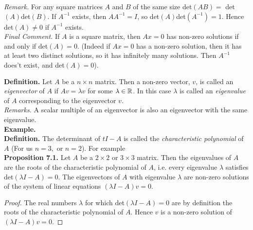\noindent \textit{Remark.} For any square matrices $A$ and $B$ of the same size det$(AB) =$ det$(A)$det$(B)$. If $A^{-1}$ exists, then $AA^{-1} = I$, so det$(A)$det$(A^{-1}) = 1$. Hence det$(A) \neq 0$ if $A^{-1}$ exists.\\

\noindent \textit{Final Comment.} If $A$ is a square matrix, then $Ax = 0$ has non-zero solutions if and only if det$(A) = 0$. (Indeed if $Ax = 0$ has a non-zero solution, then it has at least two distinct solutions, so it has infinitely many solutions. Then $A^{-1}$ does't exist, and det$(A) = 0$). 

\pagebreak


\noindent \textbf{Definition.} Let $A$ be a $n \times n$ matrix. Then a non-zero vector, $v$, is called an \emph{eigenvector} of $A$ if $Av = \lambda v$ for some $\lambda \in \mathbb{R}$. In this case $\lambda$ is called an \emph{eigenvalue} of $A$ corresponding to the eigenvector $v$.\\

\noindent \textit{Remarks.} A scalar multiple of an eigenvector is also an eigenvector with the same eigenvalue.\\

\noindent \textbf{Example.} \\

\noindent \textbf{Definition.} The determinant of $tI - A$ is called the \emph{characteristic polynomial} of $A$ (For us $n = 3,$ or $n=2$). For example\\

\noindent \textbf{Proposition 7.1.} Let $A$ be a $2 \times 2$ or $3 \times 3$ matrix. Then the eigenvalues of $A$ are the roots of the characteristic polynomial of $A$, i.e. every eigenvalue $\lambda$ satisfies det$(\lambda I - A) = 0$. The eigenvectors of $A$ with eigenvalue $\lambda$ are non-zero solutions of the system of linear equations $(\lambda I - A)v = 0$.

\begin{proof}
The real numbers $\lambda$ for which det$(\lambda I - A) = 0$ are by definition the roots of the characteristic polynomial of $A$. Hence $v$ is a non-zero solution of $(\lambda I - A)v = 0$.	
\end{proof}


